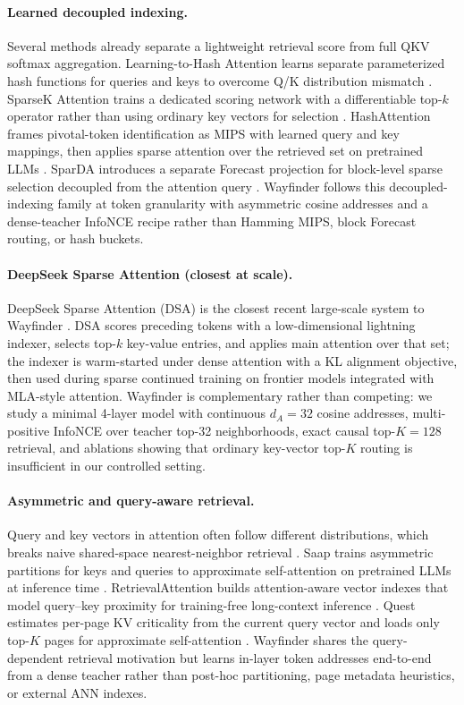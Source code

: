 \documentclass{article}
\begin{document}
\paragraph{Learned decoupled indexing.}
Several methods already separate a lightweight retrieval score from full QKV softmax aggregation. Learning-to-Hash Attention learns separate parameterized hash functions for queries and keys to overcome Q/K distribution mismatch \cite{sun2022lha}. SparseK Attention trains a dedicated scoring network with a differentiable top-$k$ operator rather than using ordinary key vectors for selection \cite{lou2024sparsek}. HashAttention frames pivotal-token identification as MIPS with learned query and key mappings, then applies sparse attention over the retrieved set on pretrained LLMs \cite{desai2025hashattention}. SparDA introduces a separate Forecast projection for block-level sparse selection decoupled from the attention query \cite{fu2026sparda}. Wayfinder follows this decoupled-indexing family at token granularity with asymmetric cosine addresses and a dense-teacher InfoNCE recipe rather than Hamming MIPS, block Forecast routing, or hash buckets.

\paragraph{DeepSeek Sparse Attention (closest at scale).}
DeepSeek Sparse Attention (DSA) is the closest recent large-scale system to Wayfinder \cite{deepseek2025v32}. DSA scores preceding tokens with a low-dimensional lightning indexer, selects top-$k$ key-value entries, and applies main attention over that set; the indexer is warm-started under dense attention with a KL alignment objective, then used during sparse continued training on frontier models integrated with MLA-style attention. Wayfinder is complementary rather than competing: we study a minimal 4-layer model with continuous $d_A{=}32$ cosine addresses, multi-positive InfoNCE over teacher top-32 neighborhoods, exact causal top-$K{=}128$ retrieval, and ablations showing that ordinary key-vector top-$K$ routing is insufficient in our controlled setting.

\paragraph{Asymmetric and query-aware retrieval.}
Query and key vectors in attention often follow different distributions, which breaks naive shared-space nearest-neighbor retrieval \cite{mazare2025saap,liu2024retrievalattention}. Saap trains asymmetric partitions for keys and queries to approximate self-attention on pretrained LLMs at inference time \cite{mazare2025saap}. RetrievalAttention builds attention-aware vector indexes that model query--key proximity for training-free long-context inference \cite{liu2024retrievalattention}. Quest estimates per-page KV criticality from the current query vector and loads only top-$K$ pages for approximate self-attention \cite{tang2024quest}. Wayfinder shares the query-dependent retrieval motivation but learns in-layer token addresses end-to-end from a dense teacher rather than post-hoc partitioning, page metadata heuristics, or external ANN indexes.
\end{document}
